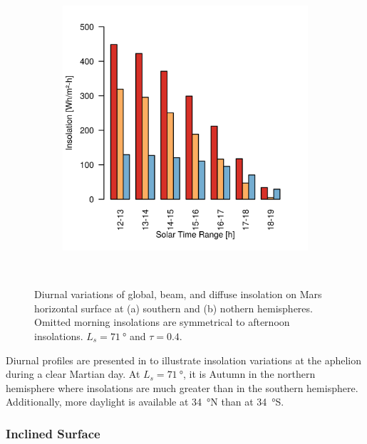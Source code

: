\begin{figure}[h]
\begin{subfigure}[t]{\subfigureWidth}
            \includegraphics[height=\graphicsHeight]{sections/mars-solar-energy/solar-radiation/plots/ih-ibh-and-idh-variation-2-for-ls-71-phi-34-tau-04-and-albedo-027.png}
            \label{fig:plot:sub:insolation-phi-p34}
    \end{subfigure}\\[0.8ex]
    \caption[Diurnal insolation variations]
    {Diurnal variations of global, beam, and diffuse insolation on Mars horizontal surface at (a) southern and (b) nothern hemispheres. Omitted morning insolations are symmetrical to afternoon insolations. $L_{s} = \SI{71}{\degree}$ and $\tau = 0.4$.}
    \label{fig:plot:insolation-phi}
\vspace{-2ex}
\end{figure}

Diurnal profiles are presented in  to illustrate insolation variations at the aphelion during a clear Martian day. At $L_{s} = \SI{71}{\degree}$, it is Autumn in the northern hemisphere where insolations are much greater than in the southern hemisphere. Additionally, more daylight is available at \SI{34}{\degree}N than at \SI{34}{\degree}S.

\subsubsection{Inclined Surface}
\label{sec:MartianEnvironment:SolarRadiation:InclinedSurface}

